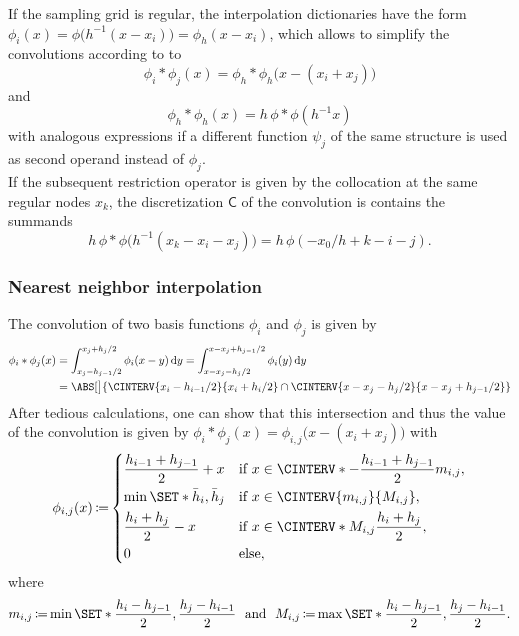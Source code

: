 \documentclass[a4paper]{paper}
\newcommand{\DISCOP}[1]{{\ensuremath{\mathsf{#1}}}}
\DeclareMathOperator{\DEFEQ}{{\coloneqq}}
\newcommand*{\D}{{\ensuremath{\mathrm{d}}}}
\begin{document}
If the sampling grid is regular, the interpolation dictionaries have the form 
$\phi_i(x) = \phi\big( h^{-1}(x-x_i) \big) = \phi_h(x-x_i)$, which allows to simplify the convolutions according to to
%
\begin{equation*}
 \phi_i \ast \phi_j(x) = \phi_h \ast \phi_h\big( x - (x_i + x_j) \big)
\end{equation*}
%
and
%
\begin{equation*}
 \phi_h \ast \phi_h(x) = h\, \phi \ast \phi(h^{-1} x)
\end{equation*}
%
with analogous expressions if a different function $\psi_j$ of the same structure is used as second operand instead of 
$\phi_j$.\\
%
If the subsequent restriction operator is given by the collocation at the same regular nodes $x_k$, the discretization 
$\DISCOP{C}$ of the convolution is contains the summands
%
\begin{equation*}
 h\, \phi \ast \phi\big( h^{-1}(x_k - x_i - x_j) \big) = h\, \phi( -x_0/h + k - i - j).
\end{equation*}


\subsubsection{Nearest neighbor interpolation}
\label{subsubsec:specif:conv:nn}

The convolution of two basis functions $\phi_i$ and $\phi_j$ is given by
%
\begin{align*}
 \phi_i \ast \phi_j(x) 
 &= \int_{x_j-h_{j-1}/2}^{x_j+h_j/2} \phi_i(x-y)\, \D y 
 = \int_{x-x_j-h_j/2}^{x-x_j+h_{j-1}/2} \phi_i(y)\, \D y \\
 &= \ABS[\big]{\CINTERV{x_i-h_{i-1}/2}{x_i+h_i/2} \cap \CINTERV{x-x_j-h_j/2}{x-x_j+h_{j-1}/2}}
\end{align*}
%
After tedious calculations, one can show that this intersection and thus the value of the convolution is given by
$\phi_i \ast \phi_j(x) = \phi_{i,j}\big( x - (x_i + x_j) \big)$ with
%
\begin{equation*}
 \phi_{i,j}(x) \DEFEQ
 \begin{dcases}
  \frac{h_{i-1} + h_{j-1}}{2} + x & \text{if } x \in \CINTERV*{-\frac{h_{i-1} + h_{j-1}}{2}}{m_{i,j}}, \\
  \min\SET*{\bar h_i, \bar h_j} & \text{if } x \in \CINTERV{m_{i,j}}{M_{i,j}}, \\
  \frac{h_i + h_j}{2} - x & \text{if } x \in \CINTERV*{M_{i,j}}{\frac{h_i + h_j}{2}}, \\
  0 & \text{else},
 \end{dcases}
\end{equation*}
%
where
%
\begin{equation*}
 m_{i,j} \DEFEQ \min\SET*{\frac{h_i - h_{j-1}}{2}, \frac{h_j - h_{i-1}}{2}}
 \ \ \text{and}\ \ 
 M_{i,j} \DEFEQ \max\SET*{\frac{h_i - h_{j-1}}{2}, \frac{h_j - h_{i-1}}{2}}.
\end{equation*}
\end{document}
